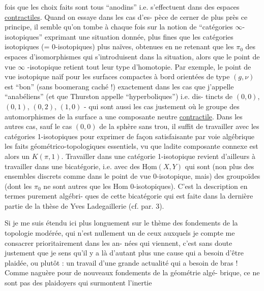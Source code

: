
fois que les choix faits sont tous ``anodins'' i.e. s'effectuent
dans des espaces \uline{contractiles}. Quand on essaye dans les cas d'es-%
pèce de cerner de plus près ce principe, il semble qu'on tombe à
chaque fois sur la notion de ``catégories $\infty$- isotopiques'' exprimant
une situation donnée, plus fines que les catégories isotopiques
(= 0-isotopiques) plus naïves, obtenues en ne retenant que les $\pi_0$
des espaces d'isomorphismes qui s'introduisent dans la situation,
alors que le point de vue $\infty$ -isotopique retient tout leur type
d'homotopie. Par exemple, le point de vue isotopique naïf pour
les surfaces compactes à bord orientées de type $(g,\nu)$ est ``bon''
(sans boomerang caché !) exactement dans les cas que j'appelle
``anabéliens'' (et que Thurston appelle ``hyperboliques'') i.e. dis-%
tincts de $(0,0)$, $(0,1)$, $(0,2)$, $(1,0)$ - qui sont aussi les cas
justement où le groupe des automorphismes de la surface a une
composante neutre \uline{contractile}. Dans les autres cas, sauf le cas
$(0,0)$ de la sphère sans trou, il suffit de travailler avec les
catégories 1-isotopiques pour exprimer de façon satisfaisante par
voie algébrique les faits géométrico-topologiques essentiels, vu
que ladite composante connexe est alors un $K(\pi,1)$. Travailler
dans une catégorie 1-isotopique revient d'ailleurs à travailler
dans une bicatégorie, i.e. avec des $\underline{\mathrm{Hom}}(X,Y)$ qui sont (non plus
des ensembles discrets comme dans le point de vue 0-isotopique,
mais) des groupoïdes (dont les $\pi_0$ ne sont autres que les Hom
0-isotopiques). C'est la description en termes purement algébri-%
ques de cette bicatégorie qui est faite dans la dernière partie
de la thèse de Yves Ladegaillerie (cf. par. 3).

Si je me suis étendu ici plus longuement sur le thème
des fondements de la topologie modérée, qui n'est nullement un de
ceux auxquels je compte me consacrer prioritairement dans les an-%
nées qui viennent, c'est sans doute justement que je sens qu'il
y a là d'autant plus une cause qui a besoin d'être plaidée, ou
plutôt : un travail d'une grande actualité qui a besoin de bras !
Comme naguère pour de nouveaux fondements de la géométrie algé-%
brique, ce ne sont pas des plaidoyers qui surmontent l'inertie

